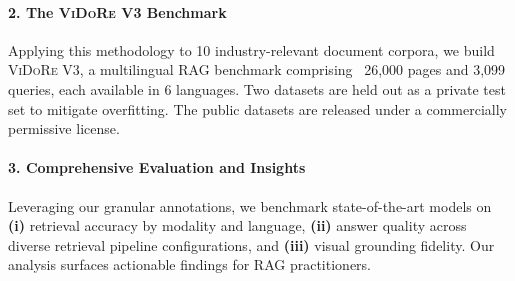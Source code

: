 \paragraph{2. The \textsc{ViDoRe} V3 Benchmark} Applying this methodology to 10 industry-relevant document corpora, we build \textsc{ViDoRe} V3, a multilingual RAG benchmark comprising ~26,000 pages and 3,099 queries, each available in 6 languages. Two datasets are held out as a private test set to mitigate overfitting. The public datasets are released under a commercially permissive license.  %
\paragraph{3. Comprehensive Evaluation and Insights} Leveraging our granular annotations, we benchmark state-of-the-art models on \textbf{(i)} retrieval accuracy by modality and language, \textbf{(ii)} answer quality across diverse retrieval pipeline configurations, and \textbf{(iii)} visual grounding fidelity. Our analysis surfaces actionable findings for RAG practitioners.


